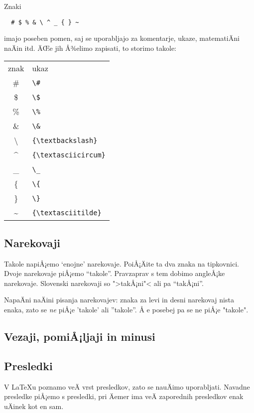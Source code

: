 \documentclass[a4paper]{article}
\begin{document}
Znaki
%
\begin{verbatim}
  # $ % & \ ^ _ { } ~
\end{verbatim}
%
imajo poseben pomen, saj se uporabljajo za komentarje, ukaze, matematiÄni naÄin itd. ÄŒe
jih Å¾elimo zapisati, to storimo takole:
%
\begin{center}
\begin{tabular}{cl}
znak & ukaz \\
\# & \verb|\#| \\
\$ & \verb|\$| \\
\% & \verb|\%| \\
\& & \verb|\&| \\
{\textbackslash} & \verb|{\textbackslash}| \\
{\textasciicircum} & \verb|{\textasciicircum}| \\
\_ & \verb|\_| \\
\{ & \verb|\{| \\
\} & \verb|\}| \\
{\textasciitilde} & \verb|{\textasciitilde}| \\
\end{tabular}
\end{center}
\subsection{Narekovaji}

Takole napiÅ¡emo `enojne' narekovaje. PoiÅ¡Äite ta dva znaka na tipkovnici. Dvoje narekovaje
piÅ¡emo ``takole''. Pravzaprav s tem dobimo angleÅ¡ke narekovaje. Slovenski narekovaji so
">takÅ¡ni"< ali pa "`takÅ¡ni"'.

NapaÄni naÄini pisanja narekovajev: znaka za levi in desni narekovaj nista enaka, zato se
\emph{ne} piÅ¡e 'takole' ali ''takole''. Å e posebej pa se ne piÅ¡e "takole".

\subsection{Vezaji, pomiÅ¡ljaji in minusi}
\label{sec:vezaji-pomilj-minusi}


\subsection{Presledki}

V {\LaTeX}u poznamo veÄ vrst presledkov, zato se nauÄimo uporabljati. Navadne presledke
piÅ¡emo s presledki, pri Äemer ima    veÄ      zaporednih presledkov enak uÄinek kot en sam.
\end{document}
